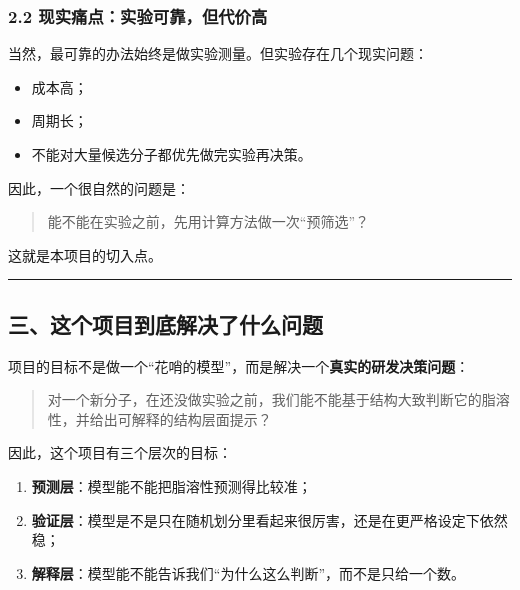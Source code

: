 \documentclass[
  ,
]{ctexart}
\providecommand{\tightlist}{%
  \setlength{\itemsep}{0pt}\setlength{\parskip}{0pt}}
\begin{document}
\hypertarget{ux73b0ux5b9eux75dbux70b9ux5b9eux9a8cux53efux9760ux4f46ux4ee3ux4ef7ux9ad8}{%
\subsubsection{2.2
现实痛点：实验可靠，但代价高}\label{ux73b0ux5b9eux75dbux70b9ux5b9eux9a8cux53efux9760ux4f46ux4ee3ux4ef7ux9ad8}}

当然，最可靠的办法始终是做实验测量。但实验存在几个现实问题：

\begin{itemize}
\tightlist
\item
  成本高；
\item
  周期长；
\item
  不能对大量候选分子都优先做完实验再决策。
\end{itemize}

因此，一个很自然的问题是：

\begin{quote}
能不能在实验之前，先用计算方法做一次``预筛选''？
\end{quote}

这就是本项目的切入点。

\begin{center}\rule{0.5\linewidth}{0.5pt}\end{center}

\hypertarget{ux4e09ux8fd9ux4e2aux9879ux76eeux5230ux5e95ux89e3ux51b3ux4e86ux4ec0ux4e48ux95eeux9898}{%
\subsection{三、这个项目到底解决了什么问题}\label{ux4e09ux8fd9ux4e2aux9879ux76eeux5230ux5e95ux89e3ux51b3ux4e86ux4ec0ux4e48ux95eeux9898}}

项目的目标不是做一个``花哨的模型''，而是解决一个\textbf{真实的研发决策问题}：

\begin{quote}
对一个新分子，在还没做实验之前，我们能不能基于结构大致判断它的脂溶性，并给出可解释的结构层面提示？
\end{quote}

因此，这个项目有三个层次的目标：

\begin{enumerate}
\def\labelenumi{\arabic{enumi}.}
\tightlist
\item
  \textbf{预测层}：模型能不能把脂溶性预测得比较准；
\item
  \textbf{验证层}：模型是不是只在随机划分里看起来很厉害，还是在更严格设定下依然稳；
\item
  \textbf{解释层}：模型能不能告诉我们``为什么这么判断''，而不是只给一个数。
\end{enumerate}
\end{document}
